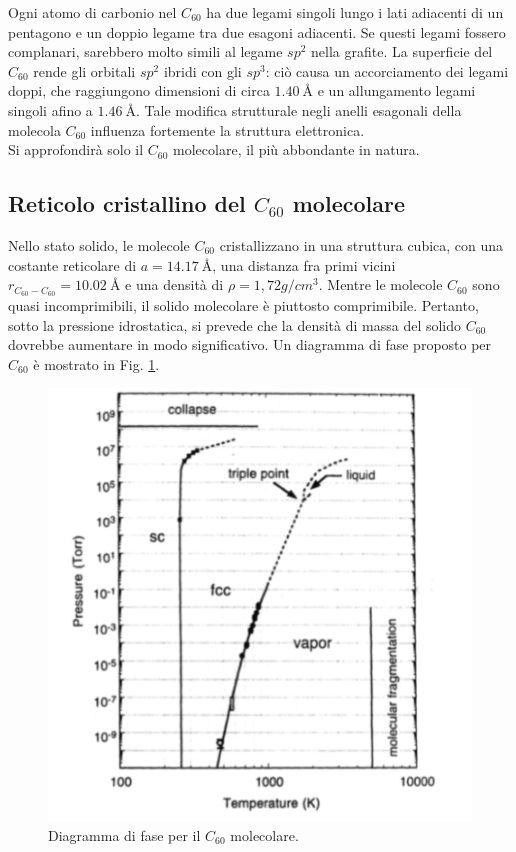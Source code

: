 \documentclass[a4paper,titlepage]{book}
\begin{document}
Ogni atomo di carbonio nel $C_{60}$ ha due legami singoli lungo i lati adiacenti di un pentagono e un doppio legame tra due esagoni adiacenti. Se questi legami fossero complanari, sarebbero molto simili al legame $sp^2$ nella grafite. La superficie del $C_{60}$ rende gli orbitali $sp^2$ ibridi con gli $sp^3$: ciò causa un accorciamento dei legami doppi, che raggiungono dimensioni di circa $\SI{1,40}\angstrom$ e un allungamento legami singoli afino a $\SI{1,46}\angstrom$. Tale modifica strutturale negli anelli esagonali della molecola $C_{60}$ influenza fortemente la struttura elettronica.\\

Si approfondirà solo il $C_{60}$ molecolare, il più abbondante in natura.
\subsection{Reticolo cristallino del $C_{60}$ molecolare}
Nello stato solido, le molecole $C_{60}$ cristallizzano in una struttura cubica, con una costante reticolare di $a=\SI{14.17}{\angstrom}$, una distanza fra primi vicini $r_{C_ {60} -C_ {60} }=\SI{10,02}{\angstrom}$ e una densità di $\rho=1,72 g / cm^3$. Mentre le molecole $C_ {60}$ sono quasi incomprimibili, il solido molecolare è piuttosto comprimibile. Pertanto, sotto la pressione idrostatica, si prevede che la densità di massa del solido $C_{60}$ dovrebbe aumentare in modo significativo. Un diagramma di fase proposto per $C_ {60}$ è mostrato in Fig. \ref{difull}.
\begin{figure}[h!] 
	\centering
	\includegraphics[width=0.7\columnwidth]{diagfulle.png}
	\caption{ 	\label{difull}
		Diagramma di fase per il $C_{60}$ molecolare.
	}
\end{figure}
\end{document}
